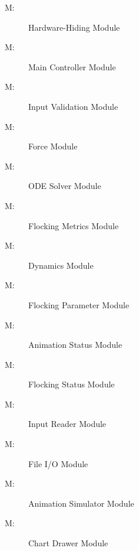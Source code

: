 \documentclass[12pt, titlepage]{article}
\newcounter{mnum}
\newcommand{\mthemnum}{M\themnum}
\begin{document}
\begin{description}
\item [ \mthemnum \label{mHH}:] Hardware-Hiding Module
\item [ \mthemnum \label{mCC}:] Main Controller Module
\item [ \mthemnum \label{mIV}:] Input Validation Module
\item [ \mthemnum \label{mForce}:] Force Module
\item [ \mthemnum \label{mODE}:] ODE Solver Module
\item [ \mthemnum \label{mFM}:] Flocking Metrics Module
\item [ \mthemnum \label{mDyna}:] Dynamics Module
\item [ \mthemnum \label{mFP}:] Flocking Parameter Module
\item [ \mthemnum \label{mAS}:] Animation Status Module
\item [ \mthemnum \label{mFS}:] Flocking Status Module
\item [ \mthemnum \label{mInput}:] Input Reader Module
\item [ \mthemnum \label{mFile}:] File I/O Module
\item [ \mthemnum \label{mAnima}:] Animation Simulator Module
\item [ \mthemnum \label{mChart}:] Chart Drawer Module
\end{description}
\end{document}

